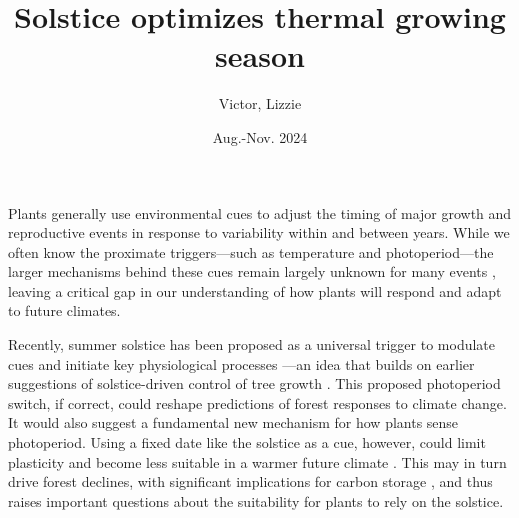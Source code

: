 \documentclass[11pt,letter]{article}
\title{Solstice optimizes thermal growing season}
\author{Victor, Lizzie}
\date{Aug.-Nov. 2024}
\begin{document}
\maketitle


Plants generally use environmental cues to adjust the timing of major growth and reproductive events in response to variability within and between years. While we often know the proximate triggers---such as temperature and photoperiod---the larger mechanisms behind these cues remain largely unknown for many events  \citep{chuinearees}, leaving a critical gap in our understanding of how plants will respond and adapt to future climates.

Recently, summer solstice has been proposed as a universal trigger to modulate cues and initiate key physiological processes \citep{Zohner2023, Journe2024}---an idea that builds on earlier suggestions of solstice-driven control of tree growth \citep{Rossi2006}. This proposed photoperiod switch, if correct, could reshape predictions of forest responses to climate change. It would also suggest a fundamental new mechanism for how plants sense photoperiod. %
Using a fixed date like the solstice as a cue, however, could limit plasticity and become less suitable in a warmer future climate \citep{Bonamour2019}. %
This may in turn drive forest declines, with significant implications for carbon storage \citep{green2022limits}, and thus raises important questions about the suitability for plants to rely on the solstice. 
\end{document}
